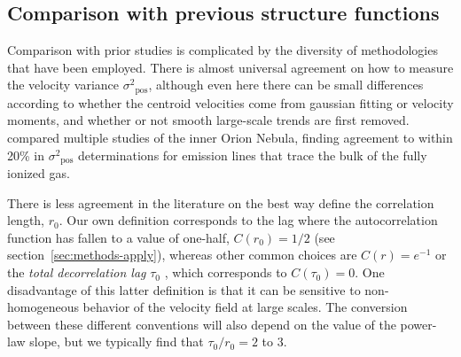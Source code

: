 \documentclass[fleqn,usenatbib, useAMS, a4paper]{mnras}
\newcounter{ionstage}
\renewcommand{\ion}[2]{\setcounter{ionstage}{#2}%
  \ensuremath{\mathrm{#1\,\scriptstyle\Roman{ionstage}}}}
\newcommand\hii{\ion{H}{2}}
\newcommand\pos{\ensuremath{_{\mathrm{pos}}}}
\begin{document}

\subsection{Comparison with previous structure functions}
\label{sec:comp-with-prev}
Comparison with prior studies is complicated by the
diversity of methodologies that  have been employed.
There is almost universal agreement on how to measure
the velocity variance \(\sigma^2\pos\),
although even here there can be small differences according
to whether the centroid velocities come from gaussian fitting
or velocity moments,
and whether or not smooth large-scale trends are first removed.
\citet{arthur2016turbulence} compared multiple studies of the
inner Orion Nebula, finding agreement to within 20\%
in \(\sigma^2\pos\) determinations
for emission lines that trace the bulk of the fully ionized gas.

There is less agreement in the literature on the best way
define the correlation length, \(r_0\).
Our own definition corresponds to the lag where the autocorrelation function
has fallen to a value of one-half,
\(C(r_0) = 1/2\) (see section~\ref{sec:methods-apply}),
whereas other common choices are \(C(r) = e^{-1}\)
\citep{Mivi1995}
or the \textit{total decorrelation lag} \(\tau_0\) \citep{lagrois2011},
which corresponds to \(C(\tau_0) = 0\).
One disadvantage of this latter definition is that it
can be sensitive to non-homogeneous behavior of the
velocity field at large scales. 
The conversion between these different conventions will also depend
on the value of the power-law slope,
but we typically find that \(\tau_0 / r_0 = \num{2}\) to \num{3}.
\end{document}

